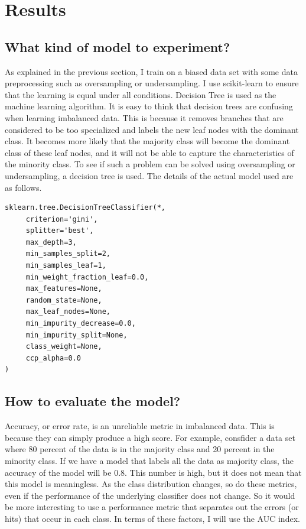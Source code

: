 \chapter{Results}

\section{What kind of model to experiment?}
As explained in the previous section, I train on a biased data set with some data preprocessing such as oversampling or undersampling.
I use scikit-learn to ensure that the learning is equal under all conditions. Decision Tree is used as the machine learning algorithm.
It is easy to think that decision trees are confusing when learning imbalanced data. This is because it removes branches that are considered to be too specialized and labels the new leaf nodes with the dominant class.
It becomes more likely that the majority class will become the dominant class of these leaf nodes, and it will not be able to capture the characteristics of the minority class.
To see if such a problem can be solved using oversampling or undersampling, a decision tree is used.
The details of the actual model used are as follows.

\begin{lstlisting}[caption=DecisionTreeClassifier,label=DecisionTreeClassifier]
sklearn.tree.DecisionTreeClassifier(*,
     criterion='gini',
     splitter='best',
     max_depth=3,
     min_samples_split=2,
     min_samples_leaf=1,
     min_weight_fraction_leaf=0.0,
     max_features=None,
     random_state=None,
     max_leaf_nodes=None,
     min_impurity_decrease=0.0,
     min_impurity_split=None,
     class_weight=None,
     ccp_alpha=0.0
)
\end{lstlisting}


\section{How to evaluate the model?}

Accuracy, or error rate, is an unreliable metric in imbalanced data.
This is because they can simply produce a high score.
For example, consfider a data set where 80 percent of the data is in the majority class and 20 percent in the minority class. If we have a model that labels all the data as majority class, the accuracy of the model will be 0.8.
This number is high, but it does not mean that this model is meaningless.
As the class distribution changes, so do these metrics, even if the performance of the underlying classifier does not change.
So it would be more interesting to use a performance metric that separates out the errors (or hits) that occur in each class.
In terms of these factors, I will use the AUC index\cite{ROC}.

